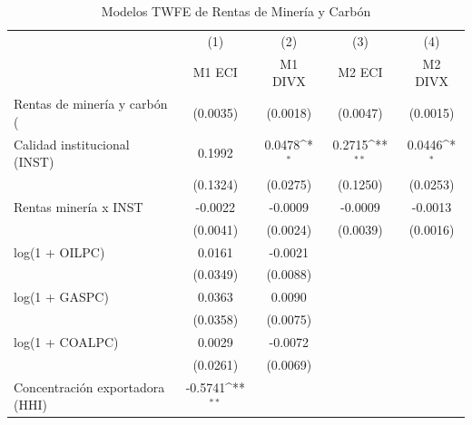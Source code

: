 \begin{table}[htbp]\centering
\def\sym#1{\ifmmode^{#1}\else\(^{#1}\)\fi}
\caption{Modelos TWFE de Rentas de Minería y Carbón}
\begin{tabular}{l*{4}{c}}
\toprule
                    &\multicolumn{1}{c}{(1)}&\multicolumn{1}{c}{(2)}&\multicolumn{1}{c}{(3)}&\multicolumn{1}{c}{(4)}\\
                    &\multicolumn{1}{c}{M1 ECI}&\multicolumn{1}{c}{M1 DIVX}&\multicolumn{1}{c}{M2 ECI}&\multicolumn{1}{c}{M2 DIVX}\\
\midrule
Rentas de minería y carbón (%
                    &    (0.0035)         &    (0.0018)         &    (0.0047)         &    (0.0015)         \\
\addlinespace
Calidad institucional (INST)&      0.1992         &      0.0478\sym{*}  &      0.2715\sym{**} &      0.0446\sym{*}  \\
                    &    (0.1324)         &    (0.0275)         &    (0.1250)         &    (0.0253)         \\
\addlinespace
Rentas minería x INST&     -0.0022         &     -0.0009         &     -0.0009         &     -0.0013         \\
                    &    (0.0041)         &    (0.0024)         &    (0.0039)         &    (0.0016)         \\
\addlinespace
log(1 + OILPC)      &      0.0161         &     -0.0021         &                     &                     \\
                    &    (0.0349)         &    (0.0088)         &                     &                     \\
\addlinespace
log(1 + GASPC)      &      0.0363         &      0.0090         &                     &                     \\
                    &    (0.0358)         &    (0.0075)         &                     &                     \\
\addlinespace
log(1 + COALPC)     &      0.0029         &     -0.0072         &                     &                     \\
                    &    (0.0261)         &    (0.0069)         &                     &                     \\
\addlinespace
Concentración exportadora (HHI)&     -0.5741\sym{**} &                     &                     &                     \\

\end{tabular}
\end{table}

